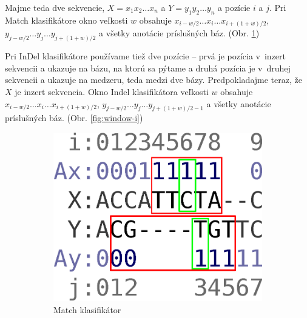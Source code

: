 Majme teda dve sekvencie, $X = x_1 x_2 \dots x_n$ a $Y = y_1 y_2 \dots y_n$ a pozície $i$ a $j$.
Pri Match klasifikátore okno veľkosti $w$ obsahuje $x_{i - w/2}\dots x_i \dots x_{i + (1 + w)/2}$, $y_{j - w/2}\dots y_j \dots y_{j + (1 + w)/2}$ a všetky anotácie príslušných báz. (Obr. \ref{fig:window-m})

Pri InDel klasifikátore používame tiež dve pozície -- prvá je pozícia v~inzert sekvencii a ukazuje na bázu, na ktorú sa pýtame a druhá pozícia je v~druhej sekvencii a ukazuje na medzeru, teda medzi dve bázy.
Predpokladajme teraz, že $X$ je inzert sekvencia. Okno Indel klasifikátora veľkosti $w$ obsahuje $x_{i - w/2}\dots x_i \dots x_{i + (1 + w)/2}$, $y_{j - w/2}\dots y_j \dots y_{j + (1 + w)/2 - 1}$ a všetky anotácie príslušných báz. (Obr. \ref{fig:window-i})

\begin{figure}[h]
        \centering
        \begin{subfigure}[b]{0.35\textwidth}
                \includegraphics[width=\textwidth]{images/window_m}
                \caption{Match klasifikátor}
                \label{fig:window-m}
        \end{subfigure}%
        \qquad\qquad %
        \begin{subfigure}[b]{0.35\textwidth}

\end{subfigure}
\end{figure}
